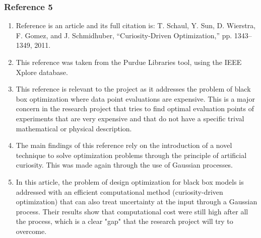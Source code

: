 \documentclass{journal}
\begin{document}
\subsubsection{Reference 5}
\begin{enumerate}
	\item Reference \cite{Schaul2011} is an article and its full citation is: T. Schaul, Y. Sun, D. Wierstra, F. Gomez, and J. Schmidhuber, “Curiosity-Driven Optimization,” pp. 1343–1349, 2011.
	\item This reference was taken from the Purdue Libraries tool, using the IEEE Xplore database.
	\item This reference is relevant to the project as it addresses the problem of black box optimization where data point evaluations are expensive. This is a major concern in the research project that tries to find optimal evaluation points of experiments that are very expensive and that do not have a specific trival mathematical or physical description.
	\item The main findings of this reference rely on the introduction of a novel technique to solve optimization problems through the principle of artificial curiosity. This was made again through the use of Gaussian processes.
	\item In this article, the problem of design optimization for black box models is addressed with an efficient computational method (curiosity-driven optimization) that can also treat uncertainty at the input through a Gaussian process. Their results show that computational cost were still high after all the process, which is a clear "gap" that the research project will try to overcome.
\end{enumerate}
\end{document}
